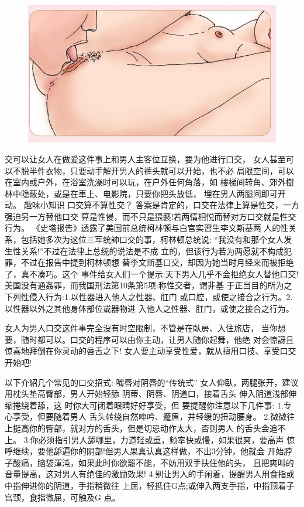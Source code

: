 \documentclass[12pt,UTF8]{ctexbook}
\begin{document}
\begin{figure}[htbp]
	\centering
	\includegraphics[width=0.7\linewidth]{19}
	\caption{}
	\label{fig:1}
\end{figure}

交可以让女人在做爱这件事上和男人主客位互换，要为他进行口交，
女人甚至可以不脱半件衣物，只要动手解开男人的裤头就可以开始，也不必
局限空间，可以在室内或户外，在浴室洗澡时可以玩，在户外任何角落，如
樓梯间转角、郊外樹林中隐蔽处，或是在車上、电影院，只要你把头放低，
埋在男人两腿间即可开动。
趣味小知识
口交算不算性交？
答案是肯定的，口交在法律上算是性交，一方强迫另一方替他口交
算是性侵，而不只是猥褻!若两情相悦而替对方口交就是性交行为。
《史塔报告》透露了美国前总统柯林顿与白宫实習生李文斯基两
人的性关系，包括她多次为这位三军统帥口交的事，柯林顿总统说:
“我没有和那个女人发生性关系!”不过在法律上总统的说法是不成
立的，但该行为若为两愿就不构成犯罪，不过在报告中提到柯林顿想
替李文斯基口交，却因为她当时月经来而被拒绝了，真不凑巧。这个
事件给女人们一个提示:天下男人几乎不会拒绝女人替他口交!
美国没有通姦罪，而我国刑法第10条第5项:称性交者，谓非基
于正当目的所为之下列性侵入行为:1.以性器进入他人之性器、肛门
或口腔，或使之接合之行为。2.以性器以外之其他身体部位或器物进
入他人之性器、肛门，或使之接合之行为。

女人为男人口交这件事完全没有时空限制，不管是在臥房、入住旅店，
当你想要，随时都可以。口交的程序可以由你主动，让男人随你起舞，他绝
对会惊訝且惊喜地拜倒在你灵动的唇舌之下!
女人要主动享受性爱，就从擅用口技、享受口交开始吧!

以下介紹几个常见的口交招式:
嘴唇对阴唇的“传统式”
女人仰臥，两腿张开，建议
用枕头垫高臀部，男人开始轻舔
阴蒂、阴唇、阴道口，接着舌头
伸入阴道浅部伸缩捲绕着舔，这
时你大可闭着眼睛好好享受，但
要提醒你注意以下几件事:
1.专心享受，但要随着男人
舌头转绕自然呻吟、蹙眉，并轻缓的扭动腰身。
2.微微往上挺高你的臀部，就对方的舌头，但是切忌动作太大，否则男人
的舌头会追不上。
3.你必须指引男人舔哪里，力道轻或重，频率快或慢，如果很爽，要高声
惊呼继续，要他舔遍你的阴部!但男人果真认真这样做，不出3分钟，他就会
开始脖子酸痛，脑袋渾沌，如果此时你欲罷不能，不妨用双手扶住他的头，
且把爽叫的音量提高，这对男人有绝佳的激励效果!
4.别让男人的手闲着，提醒男人用食指或中指伸进你的阴道，手指稍微往
上屈，轻抵住G点;或伸入两支手指，中指顶着子宫颈，食指微屈，可触及G
点。
\end{document}
